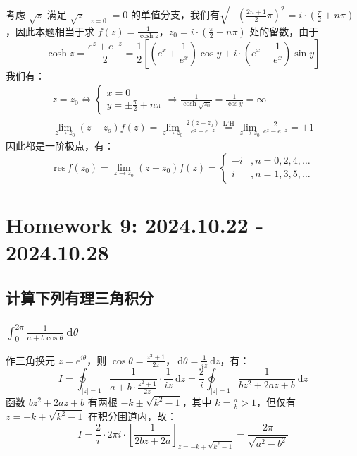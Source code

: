 \documentclass[UTF8]{report}
\def\res{\mathrm{\,res\,}}
\theoremstyle{MyLineTheoremStyle} %
\theoremstyle{MyBlockTheoremStyle} %
\theoremstyle{MySubsubsectionStyle} %
\begin{document}
\begin{enumerate}
考虑 $\sqrt{z}$ 满足 $\sqrt{z}\mid_{z = 0} = 0$ 的单值分支，我们有$\sqrt{-\left(\frac{2n + 1}{2} \pi\right)^2} = i\cdot \left(\frac{\pi}{2} + n\pi\right)$，因此本题相当于求 $f(z) = \frac{1}{\cosh z}$，$z_0 =i \cdot \left(\frac{\pi}{2} + n\pi\right)$ 处的留数，由于 
\begin{equation}
    \cosh z = \frac{e^z + e^{-z}}{2} = \frac{1}{2}\left[\left(e^x + \frac{1}{e^x}\right)\cos y + i\cdot\left(e^x - \frac{1}{e^x}\right)\sin y\right]
\end{equation}
我们有：
\begin{gather}
    z = z_0 \Longleftrightarrow 
    \begin{cases}
    x = 0 \\ 
    y = \pm \frac{\pi}{2} + n\pi
    \end{cases} \Longrightarrow \frac{1}{\cosh \sqrt{z_0}} = \frac{1}{\cos y} = \infty \\ 
    \lim_{z \to z_0} (z - z_o)f(z) = \lim_{z \to z_0} \frac{2(z - z_0)}{e^z - e^{-z}} \overset{\text{L'H}}{=} \lim_{z \to z_0} \frac{2}{e^z - e^{-z}} = \pm 1
\end{gather}
因此都是一阶极点，有：
\begin{equation}
\res f(z_0) = \lim_{z\to z_0}(z - z_0)f(z) = 
\begin{cases}
    -i &, n = 0, 2, 4, \dots \\
    i &, n = 1, 3, 5, \dots
\end{cases}
\end{equation}

\end{enumerate}

\chapter{Homework 9: 2024.10.22 - 2024.10.28}
\thispagestyle{fancy}

\section{计算下列有理三角积分}

\subsection{$\displaystyle \int_{0}^{2\pi}\frac{1}{a + b\cos \theta}\ \mathrm{d}\theta$}

作三角换元 $z = e^{i \theta}$，则 $\cos \theta = \frac{z^2 + 1}{2z}$，$\ \mathrm{d} \theta = \frac{1}{iz} \ \mathrm{d}z$，有：
\begin{equation}
I = \oint_{|z| = 1}  \frac{1}{a + b\cdot \frac{z^2 + 1}{2z}} \cdot \frac{1}{iz} \ \mathrm{d}z
= \frac{2}{i} \oint_{|z| = 1} \frac{1}{bz^2 + 2az + b} \ \mathrm{d}z
\end{equation}
函数 $bz^2 + 2az + b$ 有两根 $- k \pm \sqrt{k^2 - 1}$，其中 $k = \frac{a}{b} > 1$，但仅有 $z = - k + \sqrt{k^2 - 1}$ 在积分围道内，故：
\begin{equation}
    \boxed{
        I = \frac{2}{i} \cdot 2\pi i \cdot \left[\frac{1}{2bz + 2a}\right]_{z =  - k + \sqrt{k^2 - 1}}
    = \frac{2\pi}{\sqrt{a^2 - b^2}}
    }
\end{equation}
\end{document}
